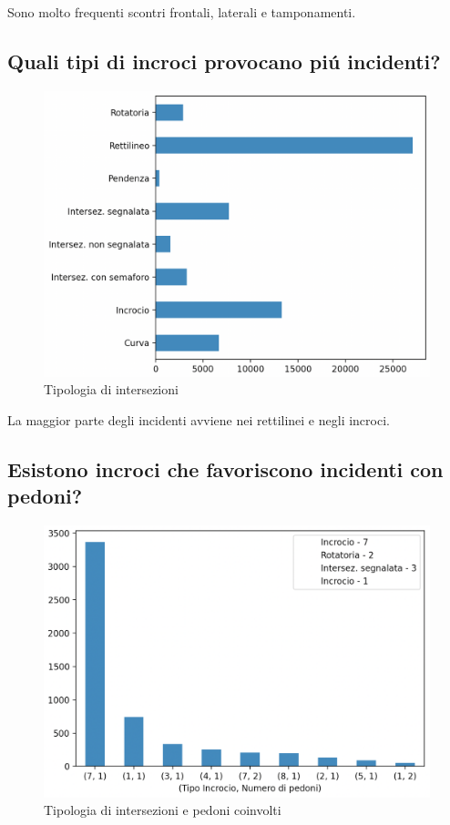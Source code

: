 \documentclass[a4paper]{report}
\begin{document}
Sono molto frequenti scontri frontali, laterali e tamponamenti.

\newpage
\subsection{Quali tipi di incroci provocano pi\'u incidenti?}

\begin{figure}[!ht]
    \includegraphics[width=\linewidth]{../src/incidenti/incidenti_senza_coords/localizzazione_incidente/intersezioni.png}
    \caption{Tipologia di intersezioni}
    \label{fig:tipo_intersezioni}
\end{figure}

La maggior parte degli incidenti avviene nei rettilinei e negli incroci.


\newpage
\subsection{Esistono incroci che favoriscono incidenti con pedoni?}

\begin{figure}[!ht]
    \includegraphics[width=\linewidth]{../src/incidenti/incidenti_senza_coords/pedoni/pedoni_incroci.png}
    \caption{Tipologia di intersezioni e pedoni coinvolti}
    \label{fig:pedoni_intersezioni}
\end{figure}
\end{document}
